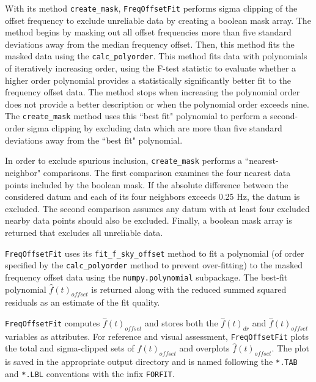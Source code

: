 \documentclass[titlepage, 12pt]{article}
\begin{document}
                With its method \texttt{create\_mask}, \texttt{FreqOffsetFit}
                performs sigma clipping of the offset frequency to
                exclude unreliable data by creating a boolean mask
                array. The method begins by masking out all offset frequencies
                more than five standard deviations away from the median
                frequency offset. Then, this method fits the masked data using
                the \texttt{calc\_polyorder}. This method fits data with polynomials of
                iteratively increasing order, using the F-test statistic to evaluate
                whether a higher order polynomial provides a statistically significantly better fit to the frequency
                offset data. The method stops when increasing the polynomial order
                does not provide a better description or when the polynomial order
                exceeds nine. The \texttt{create\_mask} method uses this ``best fit"
                polynomial to perform a second-order sigma clipping by excluding data 
                which are more than five standard deviations away from the ``best fit" 
                polynomial.
                \par\hfill\par
                In order to exclude spurious inclusion, \texttt{create\_mask}
                performs a ``nearest-neighbor" comparisons. The first comparison
                examines the four nearest data points included by the boolean mask. If
                the absolute difference between the considered datum and each of its
                four neighbors exceeds 0.25 Hz, the datum is excluded. The second 
                comparison assumes any datum with at least four excluded nearby data
                points should also be excluded. Finally, a boolean mask array is returned 
                that excludes all unreliable data.
                \par\hfill\par
                \texttt{FreqOffsetFit} uses its \texttt{fit\_f\_sky\_offset}
                method to fit a polynomial (of order specified by the \texttt{calc\_polyorder}
                method to prevent over-fitting) to the masked frequency
                offset data using the \texttt{numpy.polynomial} subpackage. The
                best-fit polynomial $\hat{f}(t)_{offset}$ is returned along with
                the reduced summed squared residuals as an estimate of the fit
                quality.
                \par\hfill\par
                \texttt{FreqOffsetFit}
                computes $\hat{f}(t)_{offset}$ and stores both the
                $\hat{f}(t)_{dr}$ and $\hat{f}(t)_{offset}$
                variables as attributes.
                For reference and visual assessment, \texttt{FreqOffsetFit}
                plots the total and sigma-clipped sets of $f(t)_{offset}$ and
                overplots $\hat{f}(t)_{offset}$. The plot is saved in the
                appropriate output directory and is named following the
                \texttt{*.TAB} and \texttt{*.LBL} conventions with the infix
                \texttt{FORFIT}.
\end{document}
